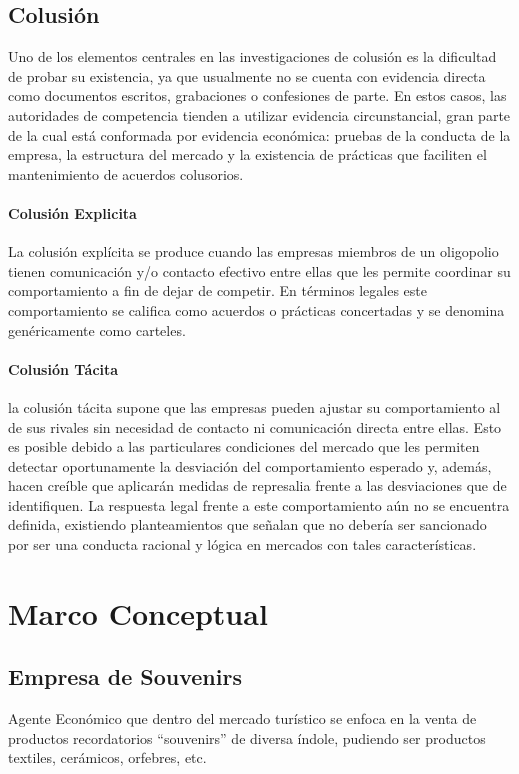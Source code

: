 			\subsection{Colusión}
			
			Uno de los elementos centrales en las investigaciones de colusión es la dificultad de probar su existencia, ya que usualmente no se cuenta con evidencia directa como documentos escritos, grabaciones o confesiones de parte. En estos casos, las autoridades de competencia tienden a utilizar evidencia circunstancial, gran parte de la cual está conformada por evidencia económica: pruebas de la conducta de la empresa, la estructura del mercado y la existencia de prácticas que faciliten el mantenimiento de acuerdos colusorios.
		
					\paragraph{Colusión Explicita}
					
					La colusión explícita se produce cuando las empresas miembros de un oligopolio tienen comunicación y/o contacto efectivo entre ellas que les permite coordinar su comportamiento a fin de dejar de competir. En términos legales este comportamiento se califica como acuerdos o prácticas concertadas y se denomina genéricamente como carteles.
					
					\paragraph{Colusión Tácita}
					la colusión tácita supone que las empresas pueden ajustar su comportamiento al de sus rivales sin necesidad de contacto ni comunicación directa entre ellas. 
					Esto es posible debido a las particulares condiciones del mercado que les permiten detectar oportunamente la desviación del comportamiento esperado y, además, hacen creíble que aplicarán medidas de represalia frente a las desviaciones que de identifiquen. La respuesta legal frente a este comportamiento aún no se encuentra definida, existiendo planteamientos que señalan que no debería ser sancionado por ser una conducta racional y lógica en mercados con tales características.
			

\newpage
		\section{Marco Conceptual}	
		
			\subsection*{Empresa de Souvenirs}
			Agente Económico que dentro del mercado turístico se enfoca en la venta de productos recordatorios ``souvenirs'' de diversa índole, pudiendo ser productos textiles, cerámicos, orfebres, etc. 
